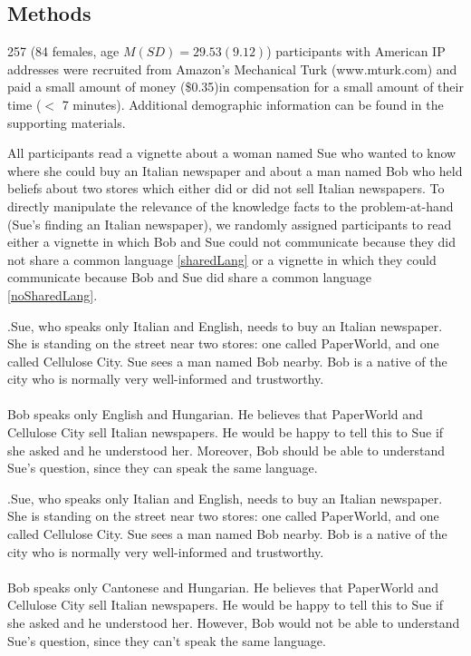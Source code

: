 \documentclass[a4paper]{article}
\begin{document}
\subsection{Methods}

257 (84 females, age $M( SD) = 29.53(9.12)$) participants with American IP addresses were recruited from Amazon's Mechanical Turk (www.mturk.com) and paid a small amount of money (\$0.35)in compensation for a small amount of their time ($<$ 7 minutes). Additional demographic information can be found in the supporting materials.

All participants read a vignette about a woman named Sue who wanted to know where she could buy an Italian newspaper and about a man named Bob who held beliefs about two stores which either did or did not sell Italian newspapers. To directly manipulate the relevance of the knowledge facts to the problem-at-hand (Sue's finding an Italian newspaper), we randomly assigned participants to read either a vignette in which Bob and Sue could not communicate because they did not share a common language \ref{sharedLang} or a vignette in which they could communicate because Bob and Sue did share a common language \ref{noSharedLang}. 

\ex.\label{sharedLang}Sue, who speaks only Italian and English, needs to buy an Italian newspaper. She is standing on the street near two stores: one called PaperWorld, and one called Cellulose City. Sue sees a man named Bob nearby. Bob is a native of the city who is normally very well-informed and trustworthy. \\ \\ Bob speaks only English and Hungarian. He believes that PaperWorld and Cellulose City sell Italian newspapers. He would be happy to tell this to Sue if she asked and he understood her. Moreover, Bob should be able to understand Sue's question, since they can speak the same language.  

\ex.\label{noSharedLang}Sue, who speaks only Italian and English, needs to buy an Italian newspaper. She is standing on the street near two stores: one called PaperWorld, and one called Cellulose City. Sue sees a man named Bob nearby. Bob is a native of the city who is normally very well-informed and trustworthy. \\ \\ Bob speaks only Cantonese and Hungarian. He believes that PaperWorld and Cellulose City sell Italian newspapers. He would be happy to tell this to Sue if she asked and he understood her. However, Bob would not be able to understand Sue's question, since they can't speak the same language.
\end{document}

